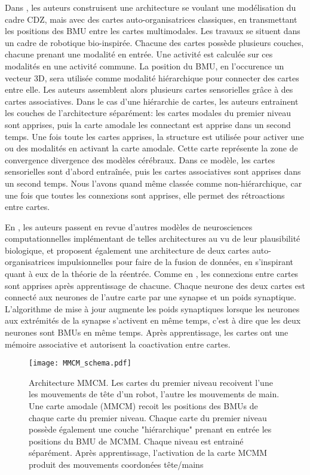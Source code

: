 \documentclass[../main]{subfiles}
\begin{document}
Dans \cite{dominey13}, les auteurs construisent une architecture se voulant une modélisation du cadre CDZ, mais avec des cartes auto-organisatrices classiques, en transmettant les positions des BMU entre les cartes multimodales. Les travaux se situent dans un cadre de robotique bio-inspirée.
Chacune des cartes possède plusieurs couches, chacune prenant une modalité en entrée. Une activité est calculée sur ces modalités en une activité commune. La position du BMU, en l'occurence un vecteur 3D, sera utilisée comme modalité hiérarchique pour connecter des cartes entre elle. Les auteurs assemblent alors plusieurs cartes sensorielles grâce à des cartes associatives.
Dans le cas d'une hiérarchie de cartes, les auteurs entrainent les couches de l'architecture séparément: les cartes modales du premier niveau sont apprises, puis la carte amodale les connectant est apprise dans un second temps. 
Une fois toute les cartes apprises, la structure est utilisée pour activer une ou des modalités en activant la carte amodale. Cette carte représente la zone de convergence divergence des modèles cérébraux. 
Dans ce modèle, les cartes sensorielles sont d'abord entraînée, puis les cartes associatives sont apprises dans un second temps. Nous l'avons quand même classée comme non-hiérarchique, car une fois que toutes les connexions sont apprises, elle permet des rétroactions entre cartes.

En \cite{khacef_brain-inspired_2020}, les auteurs passent en revue d'autres modèles de neurosciences computationnelles implémentant de telles architectures au vu de leur plausibilité biologique, et proposent également une architecture de deux cartes auto-organisatrices impulsionnelles pour faire de la fusion de données, en s'inspirant quant à eux de la théorie de la réentrée.
Comme en \cite{dominey13}, les connexions entre cartes sont apprises après apprentissage de chacune. Chaque neurone des deux cartes est connecté aux neurones de l'autre carte par une synapse et un poids synaptique. L'algorithme de mise à jour augmente les poids synaptiques lorsque les neurones aux extrémités de la synapse s'activent en même temps, c'est à dire que les deux neurones sont BMUs en même temps. Après apprentissage, les cartes ont une mémoire associative et autorisent la coactivation entre cartes.

\begin{figure}
    \centering
    \texttt{[image: MMCM\_schema.pdf]}
    \caption{Architecture MMCM. Les cartes du premier niveau recoivent l'une les mouvements de tête d'un robot, l'autre les mouvements de main. 
    Une carte amodale (MMCM) recoit les positions des BMUs de chaque carte du premier niveau. Chaque carte du premier niveau possède également une couche "hiérarchique" prenant en entrée les positions du BMU de MCMM. Chaque niveau est entrainé séparément.
    Après apprentissage, l'activation de la carte MCMM produit des mouvements coordonées tête/mains~\cite{dominey13}\label{fig:mmcm}}
\end{figure}
\end{document}
